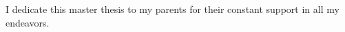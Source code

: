 \begin{center}
I dedicate this master thesis to my parents for their constant support in all my endeavors.
\end{center}
